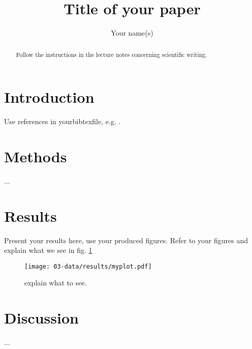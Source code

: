 \documentclass{article}
\author{Your name(s)}
\title{Title of your paper}
\begin{document}
\maketitle

\begin{abstract}
Follow the instructions in the lecture notes concerning scientific writing. 
\end{abstract}

\section{Introduction}
Use references in yourbibtexfile, e.g. \citep{Farrell-Cheaptalk-1996}.

\section{Methods}
...

\section{Results}
Present your results here, use your produced figures. Refer to your figures and explain what we see in fig. \ref{myplot}

\begin{figure}
	\centering
	\texttt{[image: 03-data/results/myplot.pdf]}
	\caption{explain what to see. \label{myplot}}
\end{figure}

\section{Discussion}
...


 



\end{document}
